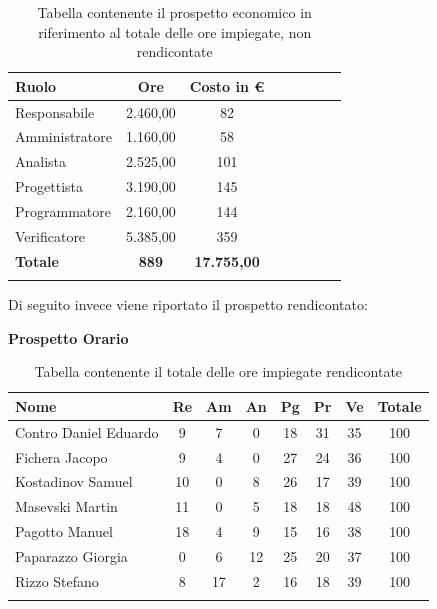\documentclass[../piano_di_progetto.tex]{subfiles}
\begin{document}
\begin{center}
	\begin{longtable}{|l|c|c|c|c|c|c|c|}
		\hline
		\rowcolor{lightgray}
		\textbf{Ruolo} & \textbf{Ore} & \textbf{Costo in €}\\

		\hline
		Responsabile & 2.460,00 & 82 \\
		\hline
		Amministratore & 1.160,00 & 58 \\
		\hline
		Analista & 2.525,00 & 101 \\
		\hline
		Progettista & 3.190,00 & 145 \\
		\hline
		Programmatore & 2.160,00 & 144 \\
		\hline
		Verificatore & 5.385,00 & 359 \\
		\hline
		\textbf{Totale} & \textbf{889} & \textbf{17.755,00}\\
		\hline
		\caption{Tabella contenente il prospetto economico in riferimento al totale delle ore impiegate, non rendicontate}
	\end{longtable}
\end{center}


Di seguito invece viene riportato il prospetto rendicontato:

\textbf{Prospetto Orario}

\begin{center}
	\begin{longtable}{|l|c|c|c|c|c|c|c|}
		\hline
		\rowcolor{lightgray}
		\textbf{Nome} & \textbf{Re} & \textbf{Am} & \textbf{An} & \textbf{Pg}  & \textbf{Pr}   & \textbf{Ve} & \textbf{Totale} \\

		\hline
			Contro Daniel Eduardo & 9 & 7 & 0 & 18 & 31 & 35 & 100 \\
		\hline
			Fichera Jacopo & 9 & 4 & 0 & 27 & 24 & 36 & 100 \\
		\hline
			Kostadinov Samuel & 10 & 0 & 8 & 26 & 17 & 39 & 100 \\		
		\hline
			Masevski Martin & 11 & 0 & 5 & 18 & 18 & 48 & 100 \\
		\hline
			Pagotto Manuel & 18 & 4 & 9 & 15 & 16 & 38 & 100 \\			
		\hline
			Paparazzo Giorgia & 0 & 6 & 12 & 25 & 20 & 37 & 100 \\
		\hline
			Rizzo Stefano & 8 & 17 & 2 & 16 & 18 & 39 & 100 \\
		\hline	

		\caption{Tabella contenente il totale delle ore impiegate rendicontate}
	\end{longtable}
\end{center}
\end{document}
